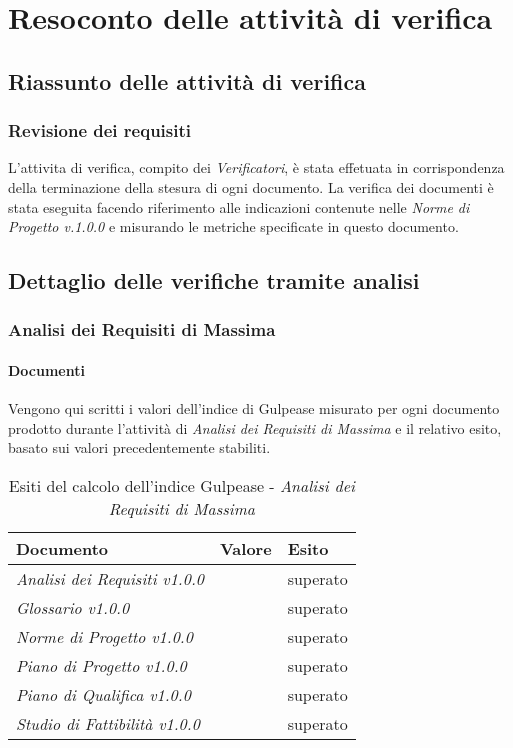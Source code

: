 \appendix
\section{Resoconto delle attività di verifica}
	\subsection{Riassunto delle attività di verifica}
	\subsubsection{Revisione dei requisiti}
	L'attivita di verifica, compito dei \textit{Verificatori}, è stata effetuata in corrispondenza della terminazione della stesura di ogni documento. La verifica dei documenti è stata eseguita facendo riferimento alle indicazioni contenute nelle \textit{Norme di Progetto v.1.0.0} e misurando le metriche specificate in questo documento.	
	
	\subsection{Dettaglio delle verifiche tramite analisi}
	\subsubsection{Analisi dei Requisiti di Massima}
	\paragraph{Documenti} \Spazio
	Vengono qui scritti i valori dell'indice di Gulpease misurato per ogni documento prodotto durante l'attività di \textit{Analisi dei Requisiti di Massima} e il relativo esito, basato sui valori precedentemente stabiliti.
	
	\begin{table}
		\begin{tabular}{|C{7cm}|C{2cm}|C{2cm}|}
			\hline
			\textbf{Documento} & \textbf{Valore} & \textbf{Esito}  \\
			\hline
			\textit{Analisi dei Requisiti v1.0.0} & & superato \\
			\hline
			\textit{Glossario v1.0.0} & & superato \\
			\hline
			\textit{Norme di Progetto v1.0.0} & & superato \\
			\hline
			\textit{Piano di Progetto v1.0.0} & & superato \\
			\hline
			\textit{Piano di Qualifica v1.0.0} & & superato \\
			\hline
			\textit{Studio di Fattibilità v1.0.0} & & superato \\
			\hline
			
		\end{tabular}
		\caption{Esiti del calcolo dell'indice Gulpease - \textit{Analisi dei Requisiti di Massima}}
	\end{table}
